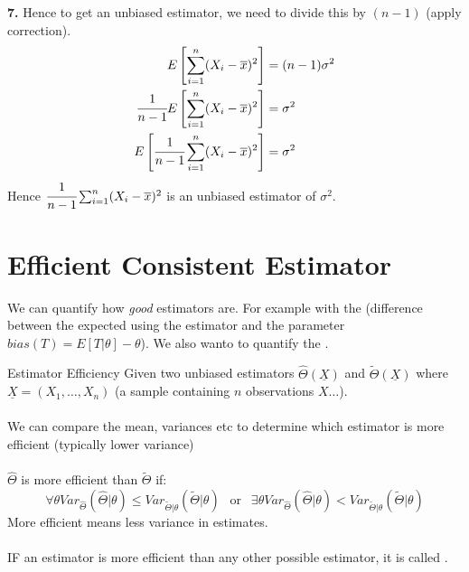 \textbf{7. } Hence to get an unbiased estimator, we need to divide this by $(n-1)$ (apply correction).
\[\begin{split}
		E\left[ \sum_{i = 1}^n ( X_i - \overline{x} )^2 \right] &= (n - 1) \sigma^2\\
		\cfrac{1}{n-1} E\left[ \sum_{i = 1}^n ( X_i - \overline{x} )^2 \right] &= \sigma^2 \\
		E\left[\cfrac{1}{n-1} \sum_{i = 1}^n ( X_i - \overline{x} )^2 \right] &= \sigma^2 \\
	\end{split}\]
Hence $\cfrac{1}{n-1} \sum_{i = 1}^n ( X_i - \overline{x} )^2 $ is an unbiased estimator of $\sigma^2$.

\section{Efficient Consistent Estimator}
We can quantify how \textit{good} estimators are. For example with the  (difference
between the expected using the estimator and the parameter $bias(T) = E[T|\theta] - \theta$). We also wanto to
quantify the .
\begin{definitionbox}{Estimator Efficiency}
	Given two unbiased estimators $\hat{\Theta}(\underline{X})$ and $\tilde{\Theta}(\underline{X})$ where $\underline{X} = (X_1, \dots, X_n)$ (a sample containing $n$ observations $X\dots$).
	\\
	\\ We can compare the mean, variances etc to determine which estimator is more efficient (typically lower variance)
	\\
	\\ $\hat{\Theta}$ is more efficient than $\tilde{\Theta}$ if:
	\[\forall \theta Var_{\hat{\Theta}}(\hat{\Theta}| \theta) \leq Var_{\tilde{\Theta} | \theta}(\tilde{\Theta} | \theta) \
		\ \text{ or }
		\ \
		\exists \theta Var_{\hat{\Theta}}(\hat{\Theta}| \theta) < Var_{\tilde{\Theta} | \theta}(\tilde{\Theta} | \theta)
	\]
	More efficient means less variance in estimates.
	\\
	\\ IF an estimator is more efficient than any other possible estimator, it is called .
\end{definitionbox}
